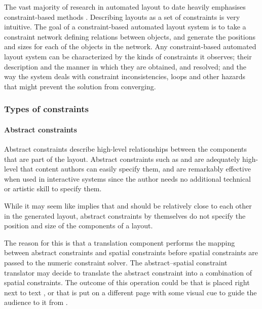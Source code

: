     The vast majority of research in automated layout to date heavily
    emphasises constraint-based methods
    \citep{vanderzanden-1,borning-1,graf-1,hudson-3,kochhar-1,hudson-2,weitzman-2,myers-2}.
    Describing layouts as a set of constraints is very intuitive. The goal of a
    constraint-based automated layout system is to take a constraint network
    defining relations between objects, and generate the positions and sizes
    for each of the objects in the network. Any constraint-based automated
    layout system can be characterized by the kinds of constraints it observes;
    their description and the manner in which they are obtained, and resolved;
    and the way the system deals with constraint inconsistencies, loops and
    other hazards that might prevent the solution from converging.

    \subsubsection{Types of constraints}

     \paragraph{Abstract constraints}

      Abstract constraints describe high-level relationships between the
      components that are part of the layout. Abstract constraints such as
       and  are adequately
      high-level that content authors can easily specify them, and are
      remarkably effective when used in interactive systems since the author
      needs no additional technical or artistic skill to specify them.

      While it may seem like  implies that
       and  should be relatively close to each other in
      the generated layout, abstract constraints by themselves do not specify
      the position and size of the components of a layout.
     
      The reason for this is that a translation component performs the mapping
      between abstract constraints and spatial constraints before spatial
      constraints are passed to the numeric constraint solver. The
      abstract–spatial constraint translator may decide to translate the
      abstract constraint  into a combination of spatial
      constraints. The outcome of this operation could be that  is placed
      right next to text , or that  is put on a different page with
      some visual cue to guide the audience to it from .

